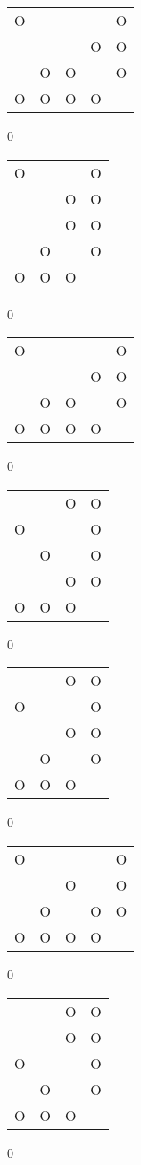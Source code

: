 \begin{tabular}{|m{0.2cm}m{0.2cm}m{0.2cm}m{0.2cm}m{0.2cm}|}\hline
O& & & &O\\
 & & &O&O\\
 &O&O& &O\\
O&O&O&O& \\
\hline\end{tabular}0
\begin{tabular}{|m{0.2cm}m{0.2cm}m{0.2cm}m{0.2cm}|}\hline
O& & &O\\
 & &O&O\\
 & &O&O\\
 &O& &O\\
O&O&O& \\
\hline\end{tabular}0
\begin{tabular}{|m{0.2cm}m{0.2cm}m{0.2cm}m{0.2cm}m{0.2cm}|}\hline
O& & & &O\\
 & & &O&O\\
 &O&O& &O\\
O&O&O&O& \\
\hline\end{tabular}0
\begin{tabular}{|m{0.2cm}m{0.2cm}m{0.2cm}m{0.2cm}|}\hline
 & &O&O\\
O& & &O\\
 &O& &O\\
 & &O&O\\
O&O&O& \\
\hline\end{tabular}0
\begin{tabular}{|m{0.2cm}m{0.2cm}m{0.2cm}m{0.2cm}|}\hline
 & &O&O\\
O& & &O\\
 & &O&O\\
 &O& &O\\
O&O&O& \\
\hline\end{tabular}0
\begin{tabular}{|m{0.2cm}m{0.2cm}m{0.2cm}m{0.2cm}m{0.2cm}|}\hline
O& & & &O\\
 & &O& &O\\
 &O& &O&O\\
O&O&O&O& \\
\hline\end{tabular}0
\begin{tabular}{|m{0.2cm}m{0.2cm}m{0.2cm}m{0.2cm}|}\hline
 & &O&O\\
 & &O&O\\
O& & &O\\
 &O& &O\\
O&O&O& \\
\hline\end{tabular}0
